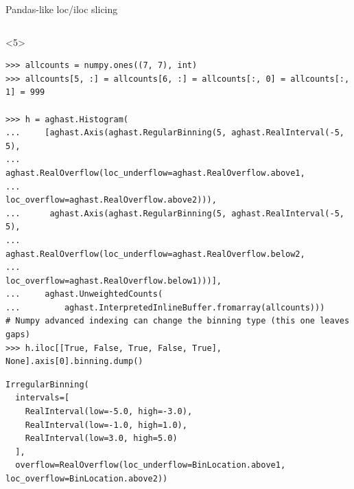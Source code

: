 \documentclass[aspectratio=169]{beamer}
\begin{document}
\begin{frame}[fragile]{Pandas-like loc/iloc slicing}
\begin{onlyenv}
\begin{verbatim}
\end{verbatim}
\end{onlyenv}
\begin{onlyenv}<5>
\begin{verbatim}
>>> allcounts = numpy.ones((7, 7), int)
>>> allcounts[5, :] = allcounts[6, :] = allcounts[:, 0] = allcounts[:, 1] = 999

>>> h = aghast.Histogram(
...     [aghast.Axis(aghast.RegularBinning(5, aghast.RealInterval(-5, 5),
...                  aghast.RealOverflow(loc_underflow=aghast.RealOverflow.above1,
...                                      loc_overflow=aghast.RealOverflow.above2))),
...      aghast.Axis(aghast.RegularBinning(5, aghast.RealInterval(-5, 5),
...                  aghast.RealOverflow(loc_underflow=aghast.RealOverflow.below2,
...                                      loc_overflow=aghast.RealOverflow.below1)))],
...     aghast.UnweightedCounts(
...         aghast.InterpretedInlineBuffer.fromarray(allcounts)))
# Numpy advanced indexing can change the binning type (this one leaves gaps)
>>> h.iloc[[True, False, True, False, True], None].axis[0].binning.dump()
\end{verbatim}
\begin{verbatim}
IrregularBinning(
  intervals=[
    RealInterval(low=-5.0, high=-3.0),
    RealInterval(low=-1.0, high=1.0),
    RealInterval(low=3.0, high=5.0)
  ],
  overflow=RealOverflow(loc_underflow=BinLocation.above1, loc_overflow=BinLocation.above2))
\end{verbatim}
\end{onlyenv}






\end{frame}
\end{document}
